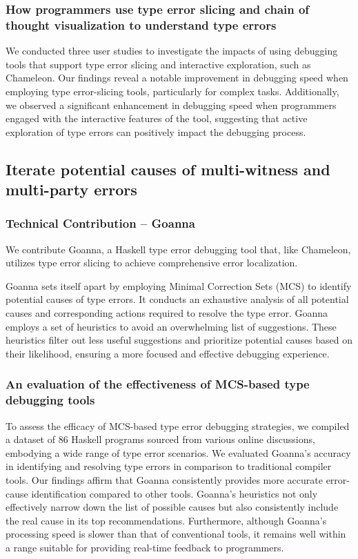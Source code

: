 \subsubsection{How programmers use type error slicing and chain of thought visualization to understand type errors}
We conducted three user studies to investigate the impacts of using debugging tools that support type error slicing and interactive exploration, such as Chameleon. Our findings reveal a notable improvement in debugging speed when employing type error-slicing tools, particularly for complex tasks. Additionally, we observed a significant enhancement in debugging speed when programmers engaged with the interactive features of the tool, suggesting that active exploration of type errors can positively impact the debugging process.

\subsection{Iterate potential causes of multi-witness and multi-party errors}

\subsubsection{Technical Contribution -- Goanna}

We contribute Goanna, a Haskell type error debugging tool that, like Chameleon, utilizes type error slicing to achieve comprehensive error localization.

Goanna sets itself apart by employing Minimal Correction Sets (MCS) to identify potential causes of type errors. It conducts an exhaustive analysis of all potential causes and corresponding actions required to resolve the type error. Goanna employs a set of heuristics to avoid an overwhelming list of suggestions. These heuristics filter out less useful suggestions and prioritize potential causes based on their likelihood, ensuring a more focused and effective debugging experience.


\subsubsection{An evaluation of the effectiveness of MCS-based type debugging tools}
To assess the efficacy of MCS-based type error debugging strategies, we compiled a dataset of 86 Haskell programs sourced from various online discussions, embodying a wide range of type error scenarios. We evaluated Goanna's accuracy in identifying and resolving type errors in comparison to traditional compiler tools. Our findings affirm that Goanna consistently provides more accurate error-cause identification compared to other tools. Goanna's heuristics not only effectively narrow down the list of possible causes but also consistently include the real cause in its top recommendations. Furthermore, although Goanna's processing speed is slower than that of conventional tools, it remains well within a range suitable for providing real-time feedback to programmers. 

